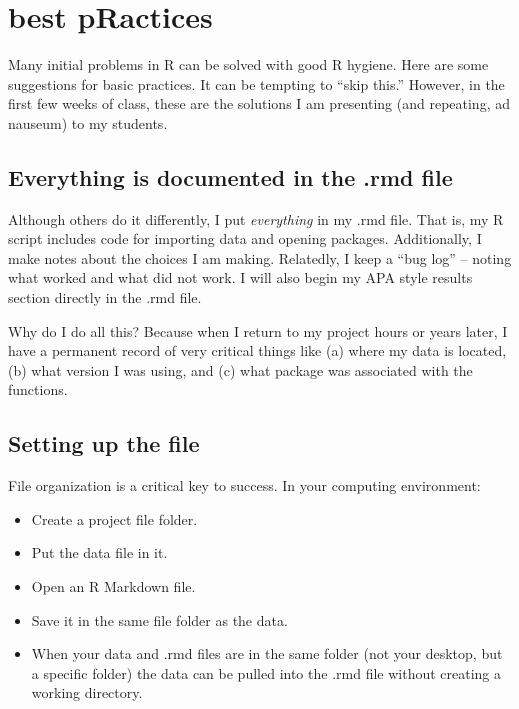 \documentclass[
  11pt,
]{book}
\providecommand{\tightlist}{%
  \setlength{\itemsep}{0pt}\setlength{\parskip}{0pt}}
\begin{document}
\hypertarget{best-practices}{%
\section{best pRactices}\label{best-practices}}

Many initial problems in R can be solved with good R hygiene. Here are some suggestions for basic practices. It can be tempting to ``skip this.'' However, in the first few weeks of class, these are the solutions I am presenting (and repeating, ad nauseum) to my students.

\hypertarget{everything-is-documented-in-the-.rmd-file}{%
\subsection{Everything is documented in the .rmd file}\label{everything-is-documented-in-the-.rmd-file}}

Although others do it differently, I put \emph{everything} in my .rmd file. That is, my R script includes code for importing data and opening packages. Additionally, I make notes about the choices I am making. Relatedly, I keep a ``bug log'' -- noting what worked and what did not work. I will also begin my APA style results section directly in the .rmd file.

Why do I do all this? Because when I return to my project hours or years later, I have a permanent record of very critical things like (a) where my data is located, (b) what version I was using, and (c) what package was associated with the functions.

\hypertarget{setting-up-the-file}{%
\subsection{Setting up the file}\label{setting-up-the-file}}

File organization is a critical key to success. In your computing environment:

\begin{itemize}
\tightlist
\item
  Create a project file folder.
\item
  Put the data file in it.
\item
  Open an R Markdown file.
\item
  Save it in the same file folder as the data.
\item
  When your data and .rmd files are in the same folder (not your desktop, but a specific folder) the data can be pulled into the .rmd file without creating a working directory.
\end{itemize}
\end{document}
